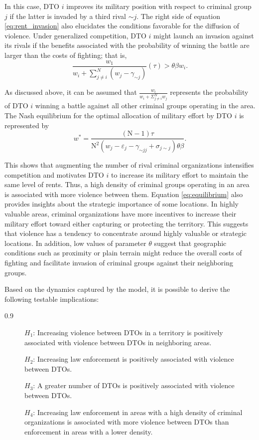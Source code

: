 \documentclass[12pt,letterpaper]{article}
\newcommand{\N}{\mathrm{N}}
\begin{document}
In this case, DTO $i$ improves its military position with respect to criminal group $j$ if the latter is invaded by a third rival $\sim j$. The right side of equation \eqref{eq:rent_invasion} also elucidates the conditions favorable for the diffusion of violence. Under generalized competition, DTO $i$ might launch an invasion against its rivals if the benefits associated with the probability of winning the battle are larger than the costs of fighting; that is,
\begin{equation}
\frac{w_{1}}{w_{i}+\sum^{N}_{j\neq i}(w_{j}-\gamma_{\sim j})}(\tau)>\theta\beta w_{i}.
\label{eq:invasion_condition}
\end{equation}

As discussed above, it can be assumed that $\frac{w_{i}}{w_{i}+\Sigma^{N}_{j\neq i}w_{j}}$ represents the probability of DTO $i$ winning a battle against all other criminal groups operating in the area. The Nash equilibrium for the optimal allocation of military effort by DTO $i$ is represented by
\begin{equation}
w^{*}=\frac{(\N-1)\tau}{\N^{2}(w_{j} - \varepsilon_{j} -\gamma_{\sim j j} +\sigma_{j \sim j})\theta\beta}.   
\label{eq:equilibrium}
\end{equation}

This shows that augmenting the number of rival criminal organizations intensifies competition and motivates DTO $i$ to increase its military effort to maintain the same level of rents. Thus, a high density of criminal groups operating in an area is associated with more violence between them. Equation \eqref{eq:equilibrium} also provides insights about the strategic importance of some locations. In highly valuable areas, criminal organizations have more incentives to increase their military effort toward either capturing or protecting the territory. This suggests that violence has a tendency to concentrate around highly valuable or strategic locations. In addition, low values of parameter $\theta$ suggest that geographic conditions such as proximity or plain terrain might reduce the overall costs of fighting and facilitate invasion of criminal groups against their neighboring groups.

Based on the dynamics captured by the model, it is possible to derive the following testable implications:
\begin{spacing}{0.9}
\begin{description}
\item [] $H_{1}$: Increasing violence between DTOs in a territory is positively associated with violence between DTOs in neighboring areas. 
\item [] $H_{2}$: Increasing law enforcement is positively associated with violence between DTOs. 
\item [] $H_{3}$: A greater number of DTOs is positively associated with violence between DTOs. 
\item [] $H_{4}$: Increasing law enforcement in areas with a high density of criminal organizations is  associated with more violence between DTOs than enforcement in areas with a lower density.
\end{description}
\end{spacing}
\end{document}
